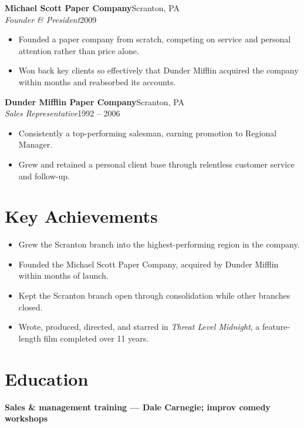 \documentclass[a4paper,10pt]{article}
\newcommand{\entry}[4]{%
  \textbf{#1}\hfill #2\\%
  \textit{#3}\hfill #4\par%
}
\newcommand{\entryline}[2]{\textbf{#1}\hfill #2\par}
\newenvironment{bullets}
  {\begin{itemize}[leftmargin=1.4em,itemsep=1.5pt,topsep=2pt,parsep=0pt]}
  {\end{itemize}}
\begin{document}
\vspace{5pt}
\entry{Michael Scott Paper Company}{Scranton, PA}{Founder \& President}{2009}
\begin{bullets}
  \item Founded a paper company from scratch, competing on service and personal attention
    rather than price alone.
  \item Won back key clients so effectively that Dunder Mifflin acquired the company within
    months and reabsorbed its accounts.
\end{bullets}

\vspace{5pt}
\entry{Dunder Mifflin Paper Company}{Scranton, PA}{Sales Representative}{1992 -- 2006}
\begin{bullets}
  \item Consistently a top-performing salesman, earning promotion to Regional Manager.
  \item Grew and retained a personal client base through relentless customer service and
    follow-up.
\end{bullets}

\section{Key Achievements}
\begin{bullets}
  \item Grew the Scranton branch into the highest-performing region in the company.
  \item Founded the Michael Scott Paper Company, acquired by Dunder Mifflin within months
    of launch.
  \item Kept the Scranton branch open through consolidation while other branches closed.
  \item Wrote, produced, directed, and starred in \textit{Threat Level Midnight}, a
    feature-length film completed over 11 years.
\end{bullets}

\section{Education}
\entryline{Sales \& management training --- Dale Carnegie; improv comedy workshops}{}

\end{document}
